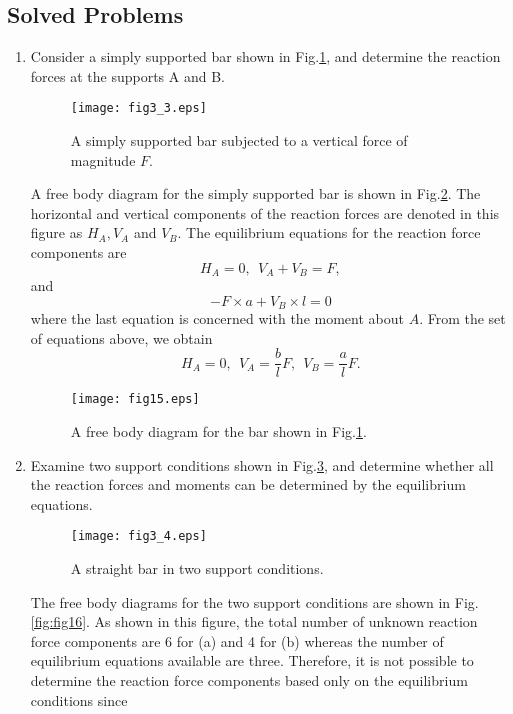 ﻿\documentclass[10pt,a4j]{article}
\begin{document}
\subsection{Solved Problems}
\begin{enumerate}
\item
Consider a simply supported bar shown in Fig.\ref{fig:fig3_3}, and 
determine the reaction forces at the supports A and B.
\begin{figure}[h]
	\begin{center}
	\texttt{[image: fig3\_3.eps]} 
	\end{center}
	\caption{A simply supported bar subjected to a vertical force of magnitude $F$.}
	\label{fig:fig3_3}
\end{figure}
{\small
	A free body diagram for the simply supported bar is shown in Fig.\ref{fig:fig15}. 
	The horizontal and vertical components of the reaction forces are denoted in
	this figure as $H_A, V_A$ and $V_B$.
	The equilibrium equations for the reaction force components are 
	\[
		H_A=0, \ \ V_A+V_B=F, 
	\]
	and 
	\[
		-F\times a +V_B\times l =0
	\]
	where the last equation is concerned with the moment about $A$.
	From the set of equations above, we obtain
	\[
		H_A=0, \ \ V_A=\frac{b}{l}F, \ \ V_B=\frac{a}{l}F.
	\]
}
	\begin{figure}[h]
	\begin{center}
	\texttt{[image: fig15.eps]} 
	\end{center}
	\caption{A free body diagram for the bar shown in Fig.\ref{fig:fig3_3}.} 
	\label{fig:fig15}
	\end{figure}
\item
Examine two support conditions shown in Fig.\ref{fig:fig3_4}, 
and determine whether all the reaction forces and moments can 
be determined by the equilibrium equations. 
\begin{figure}[h]
	\begin{center}
	\texttt{[image: fig3\_4.eps]} 
	\end{center}
	\caption{A straight bar in two support conditions.} 
	\label{fig:fig3_4}
\end{figure}
{\small
	The free body diagrams for the two support conditions are shown in Fig.\ref{fig:fig16}. 
	As shown in this figure, the total number of unknown reaction force components are  
	6 for (a) and 4 for (b) whereas the number of equilibrium equations 
	available are three. Therefore, it is not possible to determine the 
	reaction force components based only on the equilibrium conditions since 
}
\end{enumerate}
\end{document}
